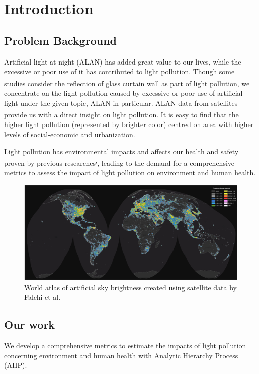 \section{\textbf{Introduction}}

\subsection{\textbf{Problem Background}}
Artificial light at night (ALAN) has added great value to our lives, while the excessive or poor use of it has contributed to light pollution. Though some studies consider the reflection of glass curtain wall as part of light pollution\textsuperscript{\cite{ref1}}, we concentrate on the light pollution caused by excessive or poor use of artificial light under the given topic, ALAN in particular. ALAN data from satellites provide us with a direct insight on light pollution\textsuperscript{\cite{ref2}}. It is easy to find that the higher light pollution (represented by brighter color) centred on area with higher levels of social-economic and urbanization. \par 
Light pollution has environmental impacts and affects our health and safety proven by previous researches\textsuperscript{\cite{ref3},\cite{ref4}}, leading to the demand for a comprehensive metrics to assess the impact of light pollution on environment and human health. \par 
\begin{figure}[ht]
    \centering
    \includegraphics[width=\textwidth]{../pictures/1 Introduction/1 satellite data.jpg}
    \caption{World atlas of artificial sky brightness created using satellite data by Falchi et al.}
\end{figure}

\subsection{\textbf{Our work}}
We develop a comprehensive metrics to estimate the impacts of light pollution concerning environment and human health with Analytic Hierarchy Process (AHP).\par 
